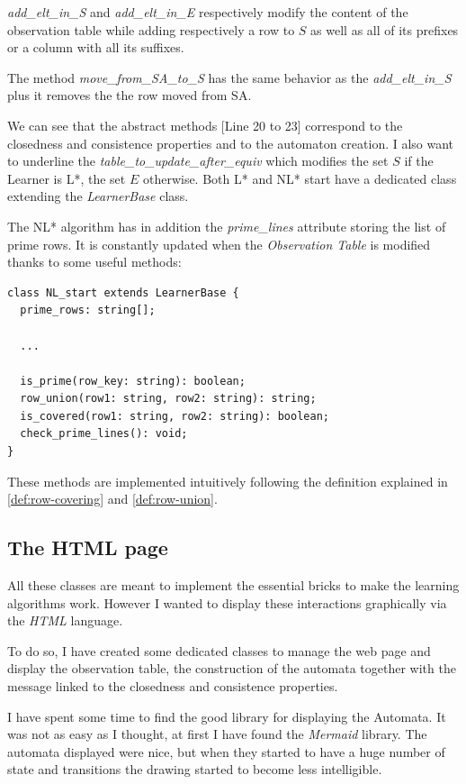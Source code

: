 \textit{add\_elt\_in\_S} and \textit{add\_elt\_in\_E} respectively modify the content of the observation table while adding respectively a row to $S$ as well as all of its prefixes or a column with all its suffixes.

The method \textit{move\_from\_SA\_to\_S} has the same behavior as the \textit{add\_elt\_in\_S} plus it removes the the row moved from SA.

We can see that the abstract methods [Line 20 to 23] correspond to the closedness and consistence properties and to the automaton creation. I also want to underline the \textit{table\_to\_update\_after\_equiv} which modifies the set $S$ if the Learner is L*, the set $E$ otherwise. Both L* and NL* start have a dedicated class extending the \textit{LearnerBase} class.

The NL* algorithm has in addition the \textit{prime\_lines} attribute storing the list of prime rows. It is constantly updated when the \textit{Observation Table} is modified thanks to some useful methods:

\begin{verbatim}
class NL_start extends LearnerBase {
  prime_rows: string[];

  ... 

  is_prime(row_key: string): boolean;
  row_union(row1: string, row2: string): string;
  is_covered(row1: string, row2: string): boolean;
  check_prime_lines(): void;
}
\end{verbatim}

These methods are implemented intuitively following the definition explained in \cref{def:row-covering} and \cref{def:row-union}.

\subsection{The HTML page}

All these classes are meant to implement the essential bricks to make the learning algorithms work. However I wanted to display these interactions graphically via the \textit{HTML} language.

To do so, I have created some dedicated classes to manage the web page and display the observation table, the construction of the automata together with the message linked to the closedness and consistence properties.

I have spent some time to find the good library for displaying the Automata. It was not as easy as I thought, at first I have found the \textit{Mermaid} library. The automata displayed were nice, but when they started to have a huge number of state and transitions the drawing started to become less intelligible.

